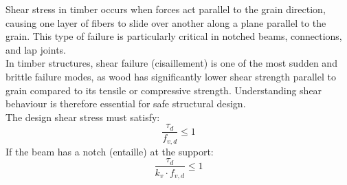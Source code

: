 Shear stress in timber occurs when forces act parallel to the grain direction, causing one layer of fibers to slide over another along a plane parallel to the grain. This type of failure is particularly critical in notched beams, connections, and lap joints. \\[4mm]
\noindent In timber structures, shear failure (cisaillement) is one of the most sudden and brittle failure modes, as wood has significantly lower shear strength parallel to grain compared to its tensile or compressive strength. Understanding shear behaviour is therefore essential for safe structural design. \\[4mm]
\noindent The design shear stress must satisfy:
\[\dfrac{\tau_d}{f_{v,d}} \leq 1\]
\noindent If the beam has a notch (entaille) at the support:
\[\dfrac{\tau_d}{k_v \cdot f_{v,d}} \leq 1\]